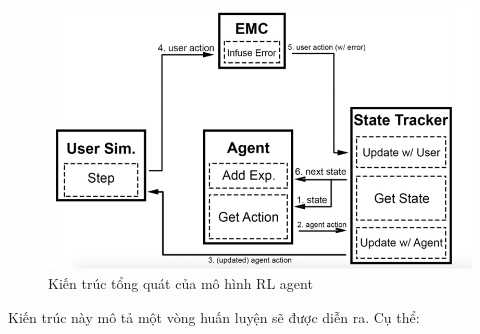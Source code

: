 \begin{center}
    \begin{figure}[ht!]
        \begin{center}
         \includegraphics[scale=1]{chapter4/img/agentmodel.png}
        \end{center}
        \caption{Kiến trúc tổng quát của mô hình RL agent}
        \label{fig:agentmodel}
    \end{figure}
\end{center}

Kiến trúc này mô tả một vòng huấn luyện sẽ được diễn ra. Cụ thể:

